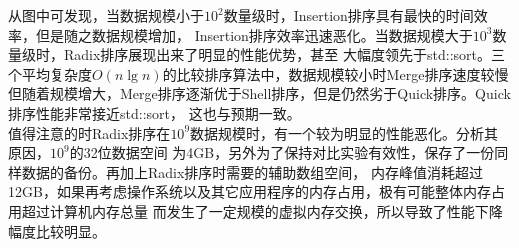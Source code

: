 \documentclass[a4paper]{article}
\begin{document}
\begin{enumerate}
\begin{center}
  \end{center}
  从图中可发现，当数据规模小于$10^2$数量级时，Insertion排序具有最快的时间效率，但是随之数据规模增加，
  Insertion排序效率迅速恶化。当数据规模大于$10^3$数量级时，Radix排序展现出来了明显的性能优势，甚至
  大幅度领先于std::sort。三个平均复杂度$O(n\lg n)$的比较排序算法中，数据规模较小时Merge排序速度较慢
  但随着规模增大，Merge排序逐渐优于Shell排序，但是仍然劣于Quick排序。Quick排序性能非常接近std::sort，
  这也与预期一致。\\
  值得注意的时Radix排序在$10^9$数据规模时，有一个较为明显的性能恶化。分析其原因，$10^9$的32位数据空间
  为4GB，另外为了保持对比实验有效性，保存了一份同样数据的备份。再加上Radix排序时需要的辅助数组空间，
  内存峰值消耗超过12GB，如果再考虑操作系统以及其它应用程序的内存占用，极有可能整体内存占用超过计算机内存总量
  而发生了一定规模的虚拟内存交换，所以导致了性能下降幅度比较明显。
\end{enumerate}
\end{document}
